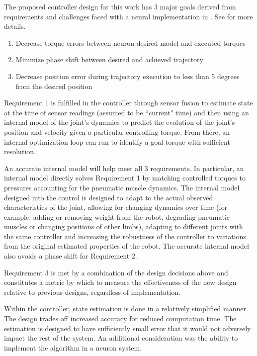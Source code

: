 The proposed controller design for this work has 3 major goals derived from
requirements and challenges faced with a neural implementation in
\cite{HuntPhDThesis}. See  for more details.

\begin{enumerate}
\item Decrease torque errors between neuron desired model and executed torques
\item Minimize phase shift between desired and achieved trajectory
\item Decrease position error during trajectory execution to less than 5 degrees from the desired position
\end{enumerate}

Requirement 1 is fulfilled in
the controller through sensor fusion to estimate state at the time of sensor
readings (assumed to be ``current" time) and then using an internal model of the
joint's dynamics to predict the evolution of the joint's position and velocity
given a particular controlling torque. From there, an internal optimization loop
can run to identify a goal torque with sufficient resolution.

An accurate internal model will help meet all 3 requirements. In particular, an
internal model directly solves Requirement 1 by matching controlled torques to
pressures accounting for the pneumatic muscle dynamics. The internal model
designed into the control is designed to adapt to the actual observed
characteristics of the joint, allowing for changing dynamics over time (for
example, adding or removing weight from the robot, degrading pneumatic muscles
or changing positions of other limbs),
adapting to different joints with the same controller and increasing the
robustness of the controller to variations from the original estimated
properties of the robot. The accurate internal model also avoids a phase shift for Requirement 2. 

Requirement 3 is met by a combination of the design decisions above and
constitutes a metric by which to measure the effectiveness of the new design
relative to previous designs, regardless of implementation.

Within the controller, state estimation is done in a relatively simplified
manner. The design trades off increased accuracy for reduced computation time. The 
estimation is designed to have sufficiently small error that it would not adversely impact the rest of the system. An additional consideration
was the ability to implement the algorithm in a neuron system.

